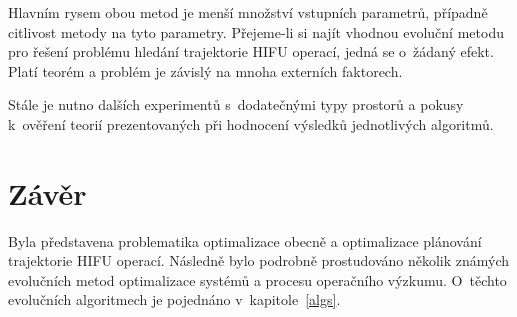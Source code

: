 Hlavním rysem obou metod je menší množství vstupních parametrů, případně citlivost metody na tyto parametry. Přejeme-li si najít vhodnou evoluční metodu pro řešení problému hledání trajektorie HIFU operací, jedná se o~žádaný efekt. Platí  teorém a problém je závislý na mnoha externích faktorech.

Stále je nutno dalších experimentů s~dodatečnými typy prostorů a pokusy k~ověření teorií prezentovaných při hodnocení výsledků jednotlivých algoritmů.



\chapter{Závěr}
\label{zaver}
Byla představena problematika optimalizace obecně a optimalizace plánování trajektorie HIFU operací. Následně bylo podrobně prostudováno několik známých evolučních metod optimalizace systémů a procesu operačního výzkumu. O~těchto evolučních algoritmech je pojednáno v~kapitole~\ref{algs}. 

